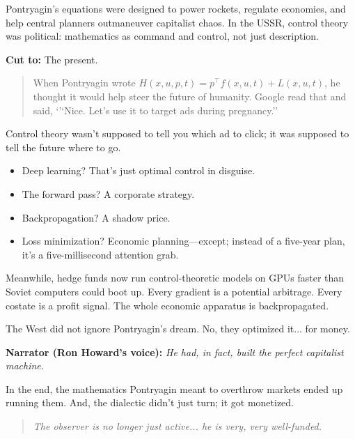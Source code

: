 Pontryagin's equations were designed to power rockets, regulate economies, and help central planners outmaneuver capitalist chaos. In the USSR, control theory was political: mathematics as command and control, not just description. 

\textbf{Cut to:} The present.

\begin{quote}
When Pontryagin wrote \( H(x, u, p, t) = p^\top f(x, u, t) + L(x, u, t) \), 
he thought it would help steer the future of humanity.  
Google read that and said, `'`Nice. Let’s use it to target ads during pregnancy.''
\end{quote}

Control theory wasn’t supposed to tell you which ad to click; it was supposed to tell the future where to go.

\begin{itemize}
  \item Deep learning? That’s just optimal control in disguise. 
  \item The forward pass? A corporate strategy. 
  \item Backpropagation? A shadow price. 
  \item Loss minimization? Economic planning—except; instead of a five-year plan, it’s a five-millisecond attention grab.
\end{itemize}

Meanwhile, hedge funds now run control-theoretic models on GPUs faster than Soviet computers could boot up. Every gradient is a potential arbitrage. Every costate is a profit signal. The whole economic apparatus is backpropagated.

The West did not ignore Pontryagin’s dream. No, they optimized it... for money.

\textbf{Narrator (Ron Howard's voice):}  
\emph{He had, in fact, built the perfect capitalist machine.}

In the end, the mathematics Pontryagin meant to overthrow markets ended up running them. And, the dialectic didn’t just turn; it got monetized.

\begin{quote}
\emph{The observer is no longer just active... he is very, very well-funded.}
\end{quote}


